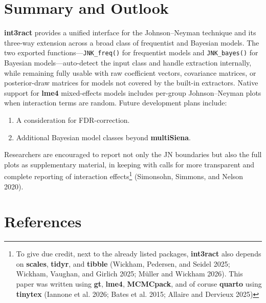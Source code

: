 \documentclass[
  letterpaper,
  DIV=11,
  numbers=noendperiod]{scrartcl}
\providecommand{\tightlist}{%
  \setlength{\itemsep}{0pt}\setlength{\parskip}{0pt}}
\begin{document}
\section{Summary and Outlook}\label{sec-conc}

\textbf{int3ract} provides a unified interface for the Johnson--Neyman
technique and its three-way extension across a broad class of
frequentist and Bayesian models. The two exported
functions---\texttt{JNK\_freq()} for frequentist models and
\texttt{JNK\_bayes()} for Bayesian models---auto-detect the input class
and handle extraction internally, while remaining fully usable with raw
coefficient vectors, covariance matrices, or posterior-draw matrices for
models not covered by the built-in extractors. Native support for
\textbf{lme4} mixed-effects models includes per-group Johnson--Neyman
plots when interaction terms are random. Future development plans
include:

\begin{enumerate}
\def\labelenumi{\arabic{enumi}.}
\tightlist
\item
  A consideration for FDR-correction.
\item
  Additional Bayesian model classes beyond \textbf{multiSiena}.
\end{enumerate}

Researchers are encouraged to report not only the JN boundaries but also
the full plots as supplementary material, in keeping with calls for more
transparent and complete reporting of interaction effects\footnote{To
  give due credit, next to the already listed packages,
  \textbf{int3ract} also depends on \textbf{scales}, \textbf{tidyr}, and
  \textbf{tibble} (Wickham, Pedersen, and Seidel 2025; Wickham, Vaughan,
  and Girlich 2025; Müller and Wickham 2026). This paper was written
  using \textbf{gt}, \textbf{lme4}, \textbf{MCMCpack}, and of coruse
  \textbf{quarto} using \textbf{tinytex} (Iannone et al. 2026; Bates et
  al. 2015; Allaire and Dervieux 2025)} (Simonsohn, Simmons, and Nelson
2020).

\section*{References}\label{references}
\end{document}
